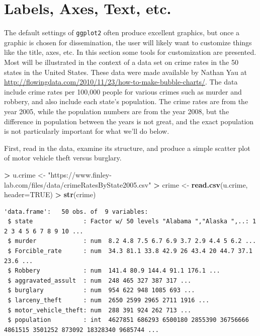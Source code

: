 \documentclass[
]{krantz}
\makeatletter
\newenvironment{Shaded}{\begin{snugshade}}{\end{snugshade}}
\newcommand{\DataTypeTok}[1]{\textcolor[rgb]{0.27,0.27,0.27}{#1}}
\newcommand{\KeywordTok}[1]{\textcolor[rgb]{0.27,0.27,0.27}{\textbf{#1}}}
\newcommand{\NormalTok}[1]{#1}
\newcommand{\OperatorTok}[1]{\textcolor[rgb]{0.43,0.43,0.43}{\textbf{#1}}}
\newcommand{\OtherTok}[1]{\textcolor[rgb]{0.37,0.37,0.37}{#1}}
\newcommand{\StringTok}[1]{\textcolor[rgb]{0.5,0.5,0.5}{#1}}
\newenvironment{kframe}{%
\medskip{}
\setlength{\fboxsep}{.8em}
 \def\at@end@of@kframe{}%
 \ifinner\ifhmode%
  \def\at@end@of@kframe{\end{minipage}}%
  \begin{minipage}{\columnwidth}%
 \fi\fi%
 \def\FrameCommand##1{\hskip\@totalleftmargin \hskip-\fboxsep
 \colorbox{shadecolor}{##1}\hskip-\fboxsep
     \hskip-\linewidth \hskip-\@totalleftmargin \hskip\columnwidth}%
 \MakeFramed {\advance\hsize-\width
   \@totalleftmargin\z@ \linewidth\hsize
   \@setminipage}}%
 {\par\unskip\endMakeFramed%
 \at@end@of@kframe}
\renewenvironment{Shaded}{\begin{kframe}}{\end{kframe}}
\makeatother
\begin{document}
\hypertarget{labels-axes-text-etc.}{%
\section{Labels, Axes, Text, etc.}\label{labels-axes-text-etc.}}

The default settings of \texttt{ggplot2} often produce excellent graphics, but once a graphic is chosen for dissemination, the user will likely want to customize things like the title, axes, etc. In this section some tools for customization are presented. Most will be illustrated in the context of a data set on crime rates in the 50 states in the United States. These data were made available by Nathan Yau at \url{http://flowingdata.com/2010/11/23/how-to-make-bubble-charts/}. The data include crime rates per 100,000 people for various crimes such as murder and robbery, and also include each state's population. The crime rates are from the year 2005, while the population numbers are from the year 2008, but the difference in population between the years is not great, and the exact population is not particularly important for what we'll do below.

First, read in the data, examine its structure, and produce a simple scatter plot of motor vehicle theft versus burglary.

\begin{Shaded}
\begin{Highlighting}[]
\OperatorTok{\textgreater{}}\StringTok{ }\NormalTok{u.crime \textless{}{-}}\StringTok{ "https://www.finley{-}lab.com/files/data/crimeRatesByState2005.csv"}
\OperatorTok{\textgreater{}}\StringTok{ }\NormalTok{crime \textless{}{-}}\StringTok{ }\KeywordTok{read.csv}\NormalTok{(u.crime, }\DataTypeTok{header=}\OtherTok{TRUE}\NormalTok{)}
\OperatorTok{\textgreater{}}\StringTok{ }\KeywordTok{str}\NormalTok{(crime)}
\end{Highlighting}
\end{Shaded}

\begin{verbatim}
'data.frame':   50 obs. of  9 variables:
 $ state              : Factor w/ 50 levels "Alabama ","Alaska ",..: 1 2 3 4 5 6 7 8 9 10 ...
 $ murder             : num  8.2 4.8 7.5 6.7 6.9 3.7 2.9 4.4 5 6.2 ...
 $ Forcible_rate      : num  34.3 81.1 33.8 42.9 26 43.4 20 44.7 37.1 23.6 ...
 $ Robbery            : num  141.4 80.9 144.4 91.1 176.1 ...
 $ aggravated_assult  : num  248 465 327 387 317 ...
 $ burglary           : num  954 622 948 1085 693 ...
 $ larceny_theft      : num  2650 2599 2965 2711 1916 ...
 $ motor_vehicle_theft: num  288 391 924 262 713 ...
 $ population         : int  4627851 686293 6500180 2855390 36756666 4861515 3501252 873092 18328340 9685744 ...
\end{verbatim}
\end{document}
